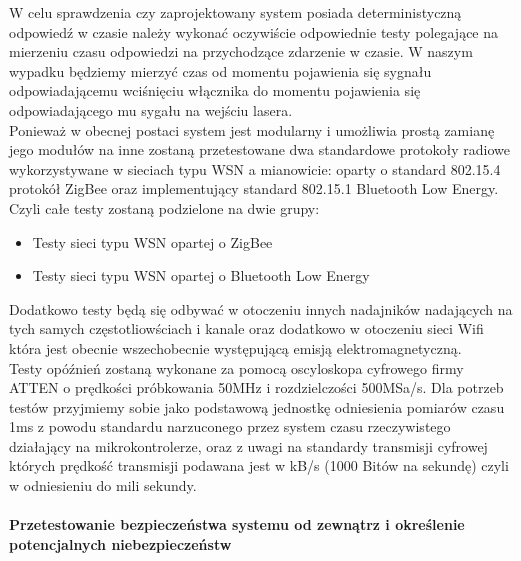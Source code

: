 W celu sprawdzenia czy zaprojektowany system posiada deterministyczną odpowiedź w czasie należy wykonać oczywiście odpowiednie testy polegające na mierzeniu czasu odpowiedzi na przychodzące zdarzenie w czasie. W naszym wypadku będziemy mierzyć czas od momentu pojawienia się sygnału odpowiadającemu wciśnięciu włącznika do momentu pojawienia się odpowiadającego mu sygału na wejściu lasera. \\
Ponieważ w obecnej postaci system jest modularny i umożliwia prostą zamianę jego modułów na inne zostaną przetestowane dwa standardowe protokoły radiowe wykorzystywane w sieciach typu WSN a mianowicie:
oparty o standard 802.15.4 protokół ZigBee oraz implementujący standard 802.15.1 Bluetooth Low Energy. \\
Czyli całe testy zostaną podzielone na dwie grupy:
\begin{itemize}
    	\item Testy sieci typu WSN opartej o ZigBee
        \item Testy sieci typu WSN opartej o Bluetooth Low Energy
    \end{itemize}
Dodatkowo testy będą się odbywać w otoczeniu innych nadajników nadających na tych samych częstotliowściach i kanale oraz dodatkowo w otoczeniu sieci Wifi która jest obecnie wszechobecnie występującą emisją elektromagnetyczną. \\
Testy opóźnień zostaną wykonane za pomocą oscyloskopa cyfrowego firmy ATTEN o prędkości próbkowania 50MHz i rozdzielczości 500MSa/s. Dla potrzeb testów przyjmiemy sobie jako podstawową jednostkę odniesienia pomiarów czasu 1ms z powodu standardu narzuconego przez system czasu rzeczywistego działający na mikrokontrolerze, oraz z uwagi na standardy transmisji cyfrowej których prędkość transmisji podawana jest w kB/s (1000 Bitów na sekundę) czyli w odniesieniu do mili sekundy. \\

\paragraph{Przetestowanie bezpieczeństwa systemu od zewnątrz i określenie potencjalnych niebezpieczeństw} \mbox{}\\

